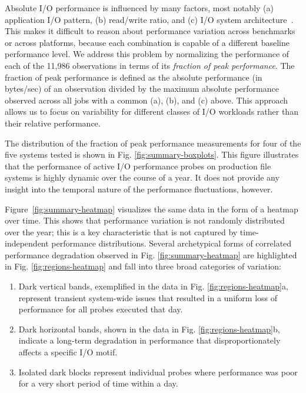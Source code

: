 Absolute I/O performance is influenced by many factors, most notably (a)
application I/O pattern, (b) read/write ratio, and (c) I/O system
architecture~\cite{Lockwood2017, Xie2012}.  This makes it difficult to
reason about performance variation across benchmarks or across platforms,
because each combination is capable of a different baseline performance
level.  We
address this problem by normalizing the
performance of each of the 11,986 observations in terms of its
\emph{fraction of peak performance}.
The fraction of peak performance is defined as the absolute performance (in
bytes/sec) of an observation divided by the maximum absolute performance
observed across all jobs with a common (a), (b), and (c) above.  This
approach allows us to focus on variability for different classes of I/O
workloads rather than their relative performance.

The distribution of the fraction of peak performance measurements for four
of the five systems tested is shown in Fig. \ref{fig:summary-boxplots}.
This figure illustrates that the performance of active I/O performance
probes on production file systems is highly dynamic over the course of a
year.  It does not provide any insight into the temporal nature of the
performance fluctuations, however.

Figure~\ref{fig:summary-heatmap} visualizes the same data in the form of a
heatmap over time.  This shows that performance variation is not randomly
distributed over the year; this is a key characteristic that is not captured by
time-independent performance distributions.
Several archetypical forms of correlated performance degradation observed in Fig. \ref{fig:summary-heatmap} are highlighted in Fig. \ref{fig:regions-heatmap} and fall into three broad categories of variation:

\begin{enumerate}[leftmargin=*]
\item Dark vertical bands, exemplified in the \mira data in Fig. \ref{fig:regions-heatmap}a, represent transient system-wide issues that resulted in a uniform loss of performance for all probes executed that day.
\item Dark horizontal bands, shown in the \cori data in Fig. \ref{fig:regions-heatmap}b, indicate a long-term degradation in performance that disproportionately affects a specific I/O motif.
\item Isolated dark blocks represent individual probes where performance was poor for a very short period of time within a day.
\end{enumerate}

